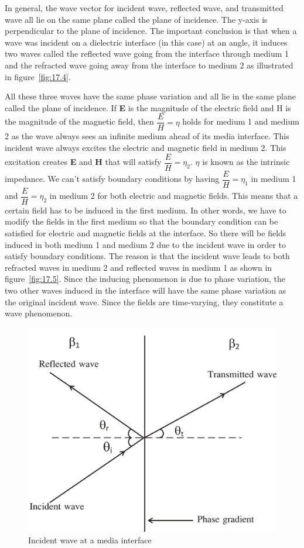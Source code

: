 In general, the wave vector for incident wave, reflected wave, and transmitted wave all lie on the same plane called the plane of incidence. The y-axis is perpendicular to the plane of incidence. The important conclusion is that when a wave was incident on a dielectric interface (in this case) at an angle, it induces two waves called the reflected wave going from the interface through medium 1  and the refracted wave going away from the interface to medium 2 as illustrated in figure~\ref{fig:17.4}.

All these three waves have the same phase variation and all lie in the same plane called the plane of incidence. If \textbf{E} is the magnitude of the electric field and H is the magnitude of the magnetic field, then $\dfrac{E}{H}=\eta$ holds for medium 1 and medium 2 as the wave always sees an infinite medium ahead of its media interface. This incident wave always excites the electric and magnetic field in medium 2. This excitation creates \textbf{E} and \textbf{H} that will satisfy $\dfrac{E}{H}=\eta_2$. $\eta$ is known as the intrinsic impedance. We can't satisfy boundary conditions by having $\dfrac{E}{H}=\eta_1$ in medium 1 and $\dfrac{E}{H}=\eta_2$ in medium 2 for both electric and magnetic fields. This means that a certain field has to be induced in the first medium. In other words, we have to modify the fields in the first medium so that the boundary condition can be satisfied for electric and magnetic fields at the interface. So there will be fields induced in both medium 1 and medium 2 due to the incident wave in order to satisfy boundary conditions. The reason is that the incident wave leads to both refracted waves in medium 2 and reflected waves in medium 1 as shown in figure~\ref{fig:17.5}. Since the inducing phenomenon is due to phase variation, the two other waves induced in the interface will have the same phase variation as the original incident wave. Since the fields are time-varying, they constitute a wave phenomenon.
\begin{figure}[h]
\centering
\includegraphics[width=.7\linewidth]{graphics/group30e}
\caption{Incident wave at a media interface}
\label{fig:group30e}
\end{figure}

